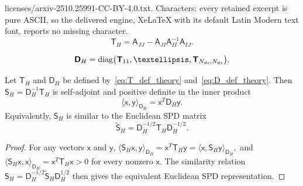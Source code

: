 \documentclass[10pt,a4paper]{amsart}
\newcommand{\mtx}[1]{\bm{\mathsf{#1}}}
\newcommand{\vct}[1]{\bm{\mathsf{#1}}}
\begin{document}
licenses/arxiv-2510.25991-CC-BY-4.0.txt. Characters: every retained excerpt is pure ASCII, so the delivered engine, XeLaTeX with its default Latin Modern text font, reports no missing character.
\begin{equation}
  \mtx{T}_H
  =\mtx{A}_{JJ}-\mtx{A}_{JI}\mtx{A}_{II}^{-1}\mtx{A}_{IJ}.
  \label{eq:T_def_theory}
\end{equation}

\begin{equation}
  \mtx{D}_H
  =\operatorname{diag}\bigl(
    \mtx{T}_{11},\ldots,
    \mtx{T}_{N_{\rm ds},N_{\rm ds}}
  \bigr).
  \label{eq:D_def_theory}
\end{equation}

\begin{proposition}
\label{prop:energy_symmetry}
Let $\mtx{T}_H$ and $\mtx{D}_H$ be defined by~\eqref{eq:T_def_theory} and~\eqref{eq:D_def_theory}.  Then $\mtx{S}_H=\mtx{D}_H^{-1}\mtx{T}_H$ is self-adjoint and positive definite in the inner product
\[
  \langle \vct{x},\vct{y}\rangle_{\mtx{D}_H}
  =\vct{x}^T\mtx{D}_H\vct{y}.
\]
Equivalently, $\mtx{S}_H$ is similar to the Euclidean SPD matrix
\begin{equation}
  \widetilde{\mtx{S}}_H
  =\mtx{D}_H^{-1/2}\mtx{T}_H\mtx{D}_H^{-1/2}.
  \label{eq:S_tilde}
\end{equation}
\end{proposition}

\begin{proof}
For any vectors $\vct{x}$ and $\vct{y}$,
$
  \langle \mtx{S}_H\vct{x},\vct{y}\rangle_{\mtx{D}_H}
  =\vct{x}^T\mtx{T}_H\vct{y}
  =\langle \vct{x},\mtx{S}_H\vct{y}\rangle_{\mtx{D}_H},
$
and
$
  \langle \mtx{S}_H\vct{x},\vct{x}\rangle_{\mtx{D}_H}
  =\vct{x}^T\mtx{T}_H\vct{x}>0
$
for every nonzero $\vct{x}$.  The similarity relation
$
  \mtx{S}_H
  =\mtx{D}_H^{-1/2}\widetilde{\mtx{S}}_H\mtx{D}_H^{1/2}
$
then gives the equivalent Euclidean SPD representation.
\end{proof}
\end{document}
